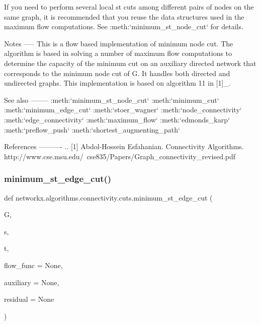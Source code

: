 \begin{DoxyVerb}
If you need to perform several local st cuts among different
pairs of nodes on the same graph, it is recommended that you reuse
the data structures used in the maximum flow computations. See
:meth:`minimum_st_node_cut` for details.

Notes
-----
This is a flow based implementation of minimum node cut. The algorithm
is based in solving a number of maximum flow computations to determine
the capacity of the minimum cut on an auxiliary directed network that
corresponds to the minimum node cut of G. It handles both directed
and undirected graphs. This implementation is based on algorithm 11
in [1]_.

See also
--------
:meth:`minimum_st_node_cut`
:meth:`minimum_cut`
:meth:`minimum_edge_cut`
:meth:`stoer_wagner`
:meth:`node_connectivity`
:meth:`edge_connectivity`
:meth:`maximum_flow`
:meth:`edmonds_karp`
:meth:`preflow_push`
:meth:`shortest_augmenting_path`

References
----------
.. [1] Abdol-Hossein Esfahanian. Connectivity Algorithms.
    http://www.cse.msu.edu/~cse835/Papers/Graph_connectivity_revised.pdf\end{DoxyVerb}
 \mbox{\label{namespacenetworkx_1_1algorithms_1_1connectivity_1_1cuts_a1c011e06a29132aba8d9d4a0b79506ae}} 
\subsubsection{\texorpdfstring{minimum\+\_\+st\+\_\+edge\+\_\+cut()}{minimum\_st\_edge\_cut()}}
{\footnotesize\ttfamily def networkx.\+algorithms.\+connectivity.\+cuts.\+minimum\+\_\+st\+\_\+edge\+\_\+cut (\begin{DoxyParamCaption}\item[{}]{G,  }\item[{}]{s,  }\item[{}]{t,  }\item[{}]{flow\+\_\+func = {\ttfamily None},  }\item[{}]{auxiliary = {\ttfamily None},  }\item[{}]{residual = {\ttfamily None} }\end{DoxyParamCaption})}

